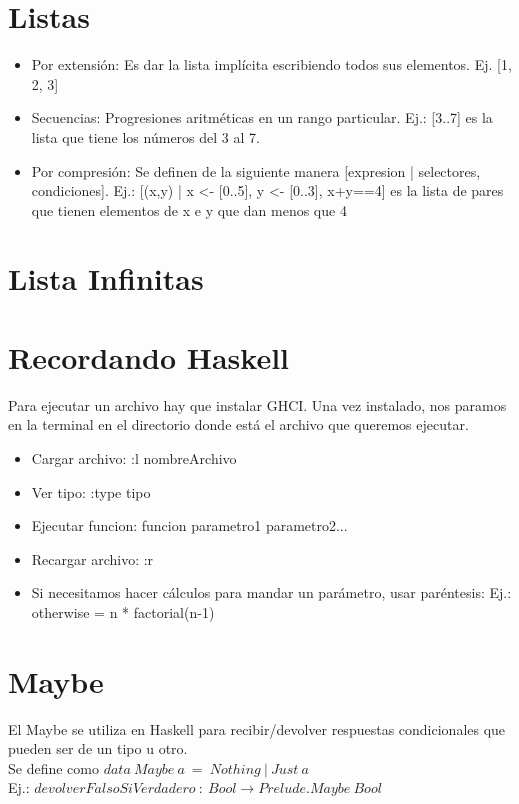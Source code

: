 \documentclass[10pt,a4paper]{article}
\begin{document}
\section*{Listas}
\begin{itemize}
    \item Por extensión: Es dar la lista implícita escribiendo todos sus elementos. Ej. [1, 2, 3]
    \item Secuencias: Progresiones aritméticas en un rango particular. Ej.: [3..7] es la lista que tiene los números del 3 al 7.
    \item Por compresión: Se definen de la siguiente manera [expresion | selectores, condiciones]. Ej.: [(x,y) | x <- [0..5], y <- [0..3], x+y==4] es la lista de pares que tienen elementos de x e y que dan menos que 4
\end{itemize}
\section*{Lista Infinitas}

\section*{Recordando Haskell}
Para ejecutar un archivo hay que instalar GHCI. Una vez instalado, nos paramos en la terminal en el directorio donde está el archivo que queremos ejecutar. 
\begin{itemize}
    \item Cargar archivo: :l nombreArchivo
    \item Ver tipo: :type tipo 
    \item Ejecutar funcion: funcion parametro1 parametro2...
    \item Recargar archivo: :r
    \item Si necesitamos hacer cálculos para mandar un parámetro, usar paréntesis: Ej.: otherwise = n * factorial(n-1)
\end{itemize} 
\section*{Maybe}
El Maybe se utiliza en Haskell para recibir/devolver respuestas condicionales que pueden ser de un tipo u otro. \\

Se define como $data \ Maybe \ a \ = \ Nothing \ | \ Just \ a$ \\

Ej.: $ devolverFalsoSiVerdadero \:: \ Bool \rightarrow Prelude.Maybe \ Bool $ \\
\end{document}
